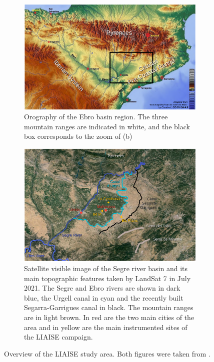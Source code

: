 \begin{figure}[hbtp]
    \centering
    \begin{subfigure}{\textwidth}
        \centering
        \includegraphics[width=0.8\linewidth]{images/chap6/liaise_area_ebro_lunel.png}
        \caption{Orography of the Ebro basin region. The three mountain ranges are indicated in white, and the black box corresponds to the zoom of (b)}
    \end{subfigure}
    \begin{subfigure}{\textwidth}
        \centering
        \includegraphics[width=0.7\linewidth]{images/chap6/liaise_area_zoom_lunel.png}
        \caption{Satellite visible image of the Segre river basin and its main topographic features taken by LandSat 7 in July 2021. The Segre and Ebro rivers are shown in dark blue, the Urgell canal in cyan and the recently built Segarra-Garrigues canal in black. The mountain ranges are in light brown. In red are the two main cities of the area and in yellow are the main instrumented sites of the LIAISE campaign.}
    \end{subfigure}
    \caption{Overview of the LIAISE study area. Both figures were taken from \citet{lunel_interactions_2024}.}
    \label{fig:liaise_area_both}
\end{figure}

